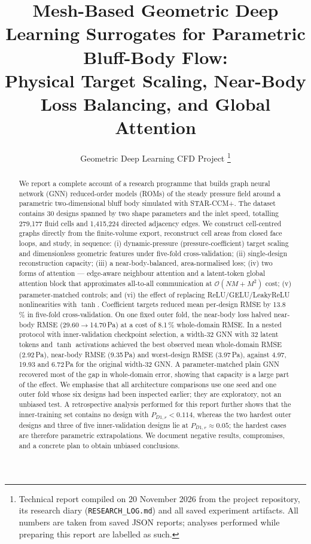 \documentclass[journal]{IEEEtran}
\newcommand{\pdone}{P_{D1,r}}
\begin{document}
\title{Mesh-Based Geometric Deep Learning Surrogates for Parametric Bluff-Body Flow:\\
Physical Target Scaling, Near-Body Loss Balancing, and Global Attention}

\author{Geometric Deep Learning CFD Project
\thanks{Technical report compiled on 20 November 2026 from the project repository,
its research diary (\texttt{RESEARCH\_LOG.md}) and all saved experiment artifacts.
All numbers are taken from saved JSON reports; analyses performed while
preparing this report are labelled as such.}}


\maketitle

\begin{abstract}
We report a complete account of a research programme that builds graph neural
network (GNN) reduced-order models (ROMs) of the steady pressure field around a
parametric two-dimensional bluff body simulated with STAR-CCM+.
The dataset contains 30 designs spanned by two shape parameters and the inlet
speed, totalling 279{,}177 fluid cells and 1{,}415{,}224 directed adjacency edges.
We construct cell-centred graphs directly from the finite-volume export,
reconstruct cell areas from closed face loops, and study, in sequence:
(i) dynamic-pressure (pressure-coefficient) target scaling and dimensionless
geometric features under five-fold cross-validation;
(ii) single-design reconstruction capacity;
(iii) a near-body-balanced, area-normalised loss;
(iv) two forms of attention --- edge-aware neighbour attention and a latent-token
global attention block that approximates all-to-all communication at
$\mathcal{O}(NM+M^2)$ cost;
(v) parameter-matched controls; and
(vi) the effect of replacing ReLU/GELU/LeakyReLU nonlinearities with $\tanh$.
Coefficient targets reduced mean per-design RMSE by 13.8\,\% in five-fold
cross-validation. On one fixed outer fold, the near-body loss halved near-body
RMSE (29.60$\rightarrow$14.70\,Pa) at a cost of 8.1\,\% whole-domain RMSE.
In a nested protocol with inner-validation checkpoint selection, a width-32 GNN
with 32 latent tokens and $\tanh$ activations achieved the best observed mean
whole-domain RMSE (2.92\,Pa), near-body RMSE (9.35\,Pa) and worst-design RMSE
(3.97\,Pa), against 4.97, 19.93 and 6.72\,Pa for the original width-32 GNN.
A parameter-matched plain GNN recovered most of the gap in whole-domain error,
showing that capacity is a large part of the effect.
We emphasise that all architecture comparisons use one seed and one outer fold
whose six designs had been inspected earlier; they are exploratory, not an
unbiased test. A retrospective analysis performed for this report further shows
that the inner-training set contains no design with $\pdone<0.114$, whereas the
two hardest outer designs and three of five inner-validation designs lie at
$\pdone\approx0.05$; the hardest cases are therefore parametric extrapolations.
We document negative results, compromises, and a concrete plan to obtain
unbiased conclusions.
\end{abstract}
\end{document}
